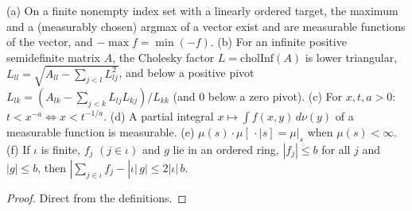 \begin{lemma}\label{lem:sg:misc-tools}
  \leanok
(a) On a finite nonempty index set with a linearly ordered target, the maximum and a (measurably chosen) argmax of a vector exist and are measurable functions of the vector, and $-\max f=\min(-f)$.
(b) For an infinite positive semidefinite matrix $A$, the Cholesky factor $L=\mathrm{cholInf}(A)$ is lower triangular, $L_{ll}=\sqrt{A_{ll}-\sum_{j<l}L_{lj}^2}$, and below a positive pivot
$L_{lk}=(A_{lk}-\sum_{j<k}L_{lj}L_{kj})/L_{kk}$ (and $0$ below a zero pivot).
(c) For $x,t,a>0$: $t<x^{-a}\iff x<t^{-1/a}$.
(d) A partial integral $x\mapsto\int f(x,y)\,d\nu(y)$ of a measurable function is measurable.
(e) $\mu(s)\cdot\mu[\,\cdot\mid s]=\mu|_s$ when $\mu(s)<\infty$.
(f) If $\iota$ is finite, $f_j$ $(j\in\iota)$ and $g$ lie in an ordered ring, $|f_j|\le b$ for all $j$ and $|g|\le b$, then $|\sum_{j \in \iota} f_j - |\iota|\,g| \le 2 |\iota|\, b$.
\end{lemma}
\begin{proof}
  \leanok
Direct from the definitions.
\end{proof}

